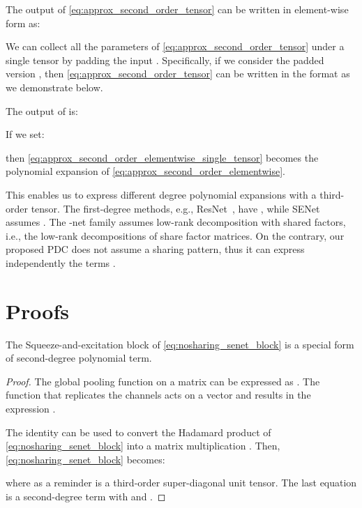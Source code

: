 \documentclass[runningheads]{llncs}
\newcommand{\resnet}{ResNet}
\newcommand{\sne}{SENet}
\newcommand{\noshare}{PDC}
\providecommand{\citep}{\cite}
\begin{document}
The  output of \eqref{eq:approx_second_order_tensor} can be written in element-wise form as:


We can collect all the parameters of \eqref{eq:approx_second_order_tensor} under a single tensor by padding the input . Specifically, if we consider the padded version , then \eqref{eq:approx_second_order_tensor} can be written in the format  as we demonstrate below. 

The  output of   is:



If we set: 



then \eqref{eq:approx_second_order_elementwise_single_tensor} becomes the polynomial expansion of \eqref{eq:approx_second_order_elementwise}. 

This enables us to express different degree polynomial expansions with a third-order tensor. The first-degree methods, e.g., \resnet~\cite{he2015deep}, have , while \sne~\cite{hu2018squeeze} assumes . The -net family assumes low-rank decomposition with shared factors, i.e., the low-rank decompositions of  share factor matrices. On the contrary, our proposed \noshare{} does not assume a sharing pattern, thus it can express independently the terms .












\section{Proofs}
\begin{claim}
    The Squeeze-and-excitation block of \eqref{eq:nosharing_senet_block} is a special form of second-degree polynomial term. 
\end{claim}

\begin{proof}
    The global pooling function on a matrix  can be expressed as . The  function that replicates the channels acts on a vector  and results in the expression . 
    
    The identity   can be used to convert the Hadamard product of \eqref{eq:nosharing_senet_block} into a matrix multiplication \citep{styan1973hadamard}.  Then, \eqref{eq:nosharing_senet_block} becomes:
    
    where as a reminder  is a third-order super-diagonal unit tensor. The last equation is a second-degree term with  and .
\end{proof}
\end{document}
